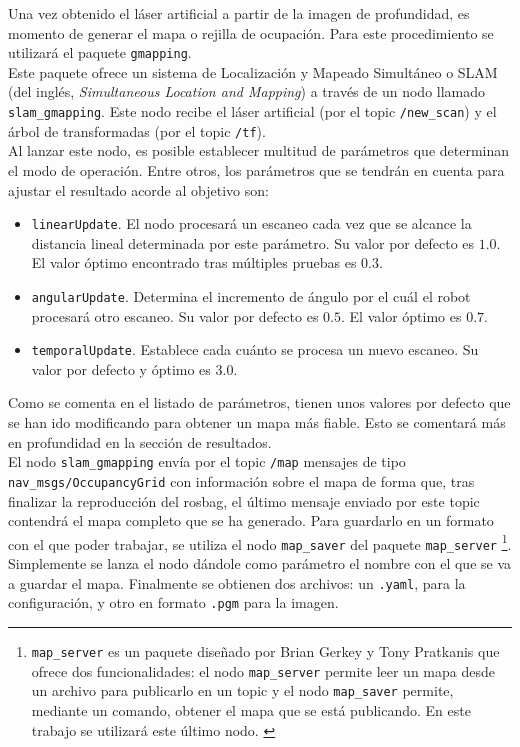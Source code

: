 Una vez obtenido el láser artificial a partir de la imagen de profundidad, es momento de generar el mapa o rejilla de ocupación. Para este procedimiento se utilizará el paquete \texttt{gmapping}.\\

Este paquete ofrece un sistema de Localización y Mapeado Simultáneo o SLAM (del inglés, \textit{Simultaneous Location and Mapping}) a través de un nodo llamado \texttt{slam\_gmapping}. Este nodo recibe el láser artificial (por el topic \texttt{/new\_scan}) y el árbol de transformadas (por el topic \texttt{/tf}).\\

Al lanzar este nodo, es posible establecer multitud de parámetros que determinan el modo de operación. Entre otros, los parámetros que se tendrán en cuenta para ajustar el resultado acorde al objetivo son:

\begin{itemize}

	\item \texttt{linearUpdate}. El nodo procesará un escaneo cada vez que se alcance la distancia lineal determinada por este parámetro. Su valor por defecto es $1.0$. El valor óptimo encontrado tras múltiples pruebas es $0.3$.
	\item \texttt{angularUpdate}. Determina el incremento de ángulo por el cuál el robot procesará otro escaneo. Su valor por defecto es $0.5$. El valor óptimo es $0.7$.
	\item \texttt{temporalUpdate}. Establece cada cuánto se procesa un nuevo escaneo. Su valor por defecto y óptimo es $3.0$.

\end{itemize}

Como se comenta en el listado de parámetros, tienen unos valores por defecto que se han ido modificando para obtener un mapa más fiable. Esto se comentará más en profundidad en la sección de resultados.\\

El nodo \texttt{slam\_gmapping} envía por el topic \texttt{/map} mensajes de tipo \texttt{nav\_msgs\-/OccupancyGrid} con información sobre el mapa de forma que, tras finalizar la reproducción del rosbag, el último mensaje enviado por este topic contendrá el mapa completo que se ha generado. Para guardarlo en un formato con el que poder trabajar, se utiliza el nodo \texttt{map\_saver} del paquete \texttt{map\_server} \footnote{\texttt{map\_server} es un paquete diseñado por Brian Gerkey y Tony Pratkanis que ofrece dos funcionalidades: el nodo \texttt{map\_server} permite leer un mapa desde un archivo para publicarlo en un topic y el nodo \texttt{map\_saver} permite, mediante un comando, obtener el mapa que se está publicando. En este trabajo se utilizará este último nodo. \cite{mapserver}}. Simplemente se lanza el nodo dándole como parámetro el nombre con el que se va a guardar el mapa. Finalmente se obtienen dos archivos: un \texttt{.yaml}, para la configuración, y otro en formato \texttt{.pgm} para la imagen.\\

